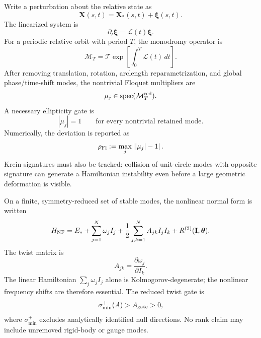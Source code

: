 Write a perturbation about the relative state as
\begin{equation}
    \mathbf X(s,t)
    =
    \mathbf X_*(s,t)
    +
    \boldsymbol\xi(s,t).
    \label{eq:rt_kam_shape_perturbation}
\end{equation}
The linearized system is
\begin{equation}
    \partial_t\boldsymbol\xi
    =
    \mathcal L(t)\boldsymbol\xi.
    \label{eq:rt_kam_linearized_shape_operator}
\end{equation}
For a periodic relative orbit with period \(T\), the monodromy operator is
\begin{equation}
    \mathcal M_T
    =
    \mathcal T
    \exp\!\left[
    \int_0^T\mathcal L(t)\,dt
    \right].
    \label{eq:rt_kam_monodromy_operator}
\end{equation}
After removing translation, rotation, arclength reparametrization, and global
phase/time-shift modes, the nontrivial Floquet multipliers are
\begin{equation}
    \mu_j\in\operatorname{spec}(\mathcal M_T^{\rm red}).
    \label{eq:rt_kam_reduced_floquet_multipliers}
\end{equation}
A necessary ellipticity gate is
\begin{equation}
    |\mu_j|=1
    \qquad
    \text{for every nontrivial retained mode}.
    \label{eq:rt_kam_floquet_ellipticity_gate}
\end{equation}
Numerically, the deviation is reported as
\begin{equation}
    \rho_{\rm Fl}
    :=
    \max_j\left||\mu_j|-1\right|.
    \label{eq:rt_kam_floquet_residual}
\end{equation}
Krein signatures must also be tracked: collision of unit-circle modes with
opposite signature can generate a Hamiltonian instability even before a large
geometric deformation is visible.

On a finite, symmetry-reduced set of stable modes, the nonlinear normal form
is written
\begin{equation}
    H_{\rm NF}
    =
    E_*
    +
    \sum_{j=1}^{N}\omega_j I_j
    +
    \frac12
    \sum_{j,k=1}^{N}A_{jk}I_jI_k
    +
    R^{(3)}(\mathbf I,\boldsymbol\theta).
    \label{eq:rt_kam_nonlinear_normal_form}
\end{equation}
The twist matrix is
\begin{equation}
    A_{jk}
    =
    \frac{\partial\omega_j}{\partial I_k}.
    \label{eq:rt_kam_twist_matrix}
\end{equation}
The linear Hamiltonian \(\sum_j\omega_jI_j\) alone is Kolmogorov-degenerate;
the nonlinear frequency shifts are therefore essential.  The reduced twist
gate is
\begin{equation}
    \sigma_{\min}^{+}(A)
    >
    A_{\rm gate}>0,
    \label{eq:rt_kam_twist_gate}
\end{equation}
where \(\sigma_{\min}^{+}\) excludes analytically identified null directions.
No rank claim may include unremoved rigid-body or gauge modes.

